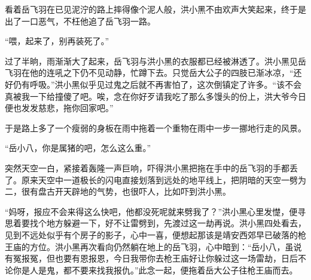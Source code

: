 看着岳飞羽在已见泥泞的路上摔得像个泥人般，洪小黑不由欢声大笑起来，终于是出了一口恶气，不枉他追了岳飞羽一路。

“喂，起来了，别再装死了。”

过了半晌，雨渐渐大了起来，岳飞羽与洪小黑的衣服都已经被淋透了。洪小黑见岳飞羽在他的连吼之下仍不见动静，忙蹲下去。只觉岳大公子的四肢已渐冰凉，“还好仍有呼吸。”洪小黑似乎见过鬼之后就不再害怕了，这次倒镇定了许多。“该不会真被我一下给撞傻了吧。唉，念在你好歹请我吃了那么多馒头的份上，洪大爷今日便也发发慈悲，拖你回家吧。”

于是路上多了一个瘦弱的身板在雨中拖着一个重物在雨中一步一挪地行走的风景。

“岳小八，你是属猪的吧，怎么这么重。”

突然天空一白，紧接着轰隆一声巨响，吓得洪小黑把拖在手中的岳飞羽的手都丢了。原来天空中一道极长的闪电直接划落到远处的地平线上，把阴暗的天空一劈为二，很有盘古开天辟地的气势，也很吓人，比如吓到洪小黑。

“妈呀，报应不会来得这么快吧，他都没死呢就来劈我了？”洪小黑心里发憷，便寻思着要找个地方躲避一下，好不让雷劈到，先渡过这一劫再说。洪小黑四处看去，见到不远处似乎有个房子的影子，心中一喜，便想起那该是靖安西郊早已破落的枪王庙的方位。洪小黑再次看向仍然躺在地上的岳飞羽，心中暗到：“岳小八，虽说有冤报冤，但也要有恩报恩，今日我带你去枪王庙好让你躲过这一场雷劫，日后不论你是人是鬼，都不要来找我报仇。”此念一起，便拖着岳大公子往枪王庙而去。


